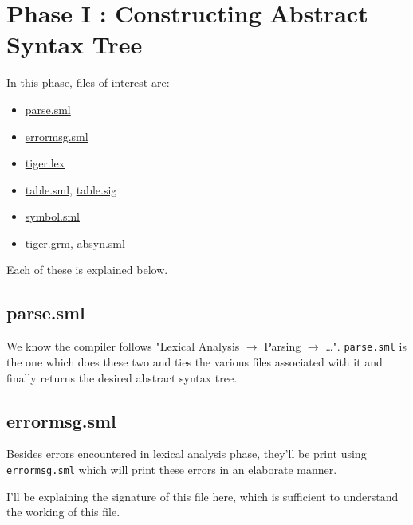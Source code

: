 \chapter{Phase I : Constructing Abstract Syntax Tree}

In this phase, files of interest are:-

\begin{itemize}
  \item \href{\git parse.sml}{parse.sml}
  \item \href{\git errormsg.sml}{errormsg.sml}
  \item \href{\git tiger.lex}{tiger.lex}
  \item \href{\git table.sml}{table.sml}, \href{\git table.sig}{table.sig}
  \item \href{\git symbol.sml}{symbol.sml} 
  \item \href{\git tiger.grm}{tiger.grm}, \href{\git absyn.sml}{absyn.sml} 
\end{itemize}

Each of these is explained below.

\section{parse.sml}

We know the compiler follows "Lexical Analysis $\rightarrow$ Parsing $\rightarrow$ \dots". \texttt{parse.sml} is the one which does these two and ties the various files associated with it and finally returns the desired abstract syntax tree.

\section{errormsg.sml}

Besides errors encountered in lexical analysis phase, they'll be print using \texttt{errormsg.sml} which will print these errors in an elaborate manner.

I'll be explaining the signature of this file here, which is sufficient to understand the working of this file.

